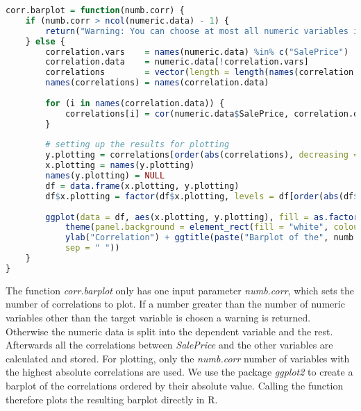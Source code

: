 \begin{lstlisting}[language=R]
corr.barplot = function(numb.corr) {
    if (numb.corr > ncol(numeric.data) - 1) {
        return("Warning: You can choose at most all numeric variables in the dataset except the target variable SalePrice, which is already implemented as default value")
    } else {
        correlation.vars    = names(numeric.data) %in% c("SalePrice")
        correlation.data    = numeric.data[!correlation.vars]                  # subsetting the numeric variables to not contain the target variable
        correlations        = vector(length = length(names(correlation.data))) # setting up vector for results (correlations)
        names(correlations) = names(correlation.data)
        
        for (i in names(correlation.data)) {                                   # calculating all bivariate correlations
            correlations[i] = cor(numeric.data$SalePrice, correlation.data[i], use = "pairwise.complete.obs")
        }
        
        # setting up the results for plotting
        y.plotting = correlations[order(abs(correlations), decreasing = TRUE)][1:numb.corr]
        x.plotting = names(y.plotting)
        names(y.plotting) = NULL
        df = data.frame(x.plotting, y.plotting)
        df$x.plotting = factor(df$x.plotting, levels = df[order(abs(df$y.plotting), decreasing = TRUE), "x.plotting"])
        
        ggplot(data = df, aes(x.plotting, y.plotting), fill = as.factor(x.plotting)) + geom_bar(stat = "identity", color = "black", fill = "black") + 
            theme(panel.background = element_rect(fill = "white", colour = "black"),axis.title.x = element_blank(), axis.text.x = element_text(angle = 90, vjust = 0.5, size = 12)) + 
            ylab("Correlation") + ggtitle(paste("Barplot of the", numb.corr, "highest bivariate correlations with SalePrice", 
            sep = " "))
    }
}
\end{lstlisting}
The function \textit{corr.barplot} only has one input parameter \textit{numb.corr}, which sets the number of correlations to plot. If a number greater than the number of numeric variables other than the target variable is chosen a warning is returned. Otherwise the numeric data is split into the dependent variable and the rest. Afterwards all the correlations between \textit{SalePrice} and the other variables are calculated and stored. For plotting, only the \textit{numb.corr} number of variables with the highest absolute correlations are used. We use the package \textit{ggplot2} to create a barplot of the  correlations ordered by their absolute value. Calling the function therefore plots the resulting barplot directly in \textsf{R}. \\
